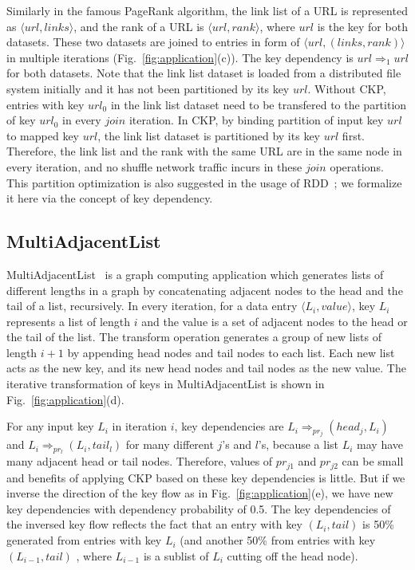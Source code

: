 \documentclass[10pt,journal,compsoc]{IEEEtran}
\begin{document}
Similarly in the famous PageRank algorithm, 
the link list of a URL is represented as $\langle url, links \rangle$,
and the rank of a URL is $\langle url, rank \rangle$, 
where $url$ is the key for both datasets. 
These two datasets are joined to entries in form of 
$\langle url, (links, rank) \rangle$ in multiple iterations (Fig.~\ref{fig:application}(c)).
The key dependency is $url \Rightarrow_{1} url$ for both datasets.
Note that the link list dataset is loaded from a distributed 
file system initially and it has not been partitioned 
by its key $url$. 
Without CKP, entries with key $url_0$ in the link list dataset need
to be transfered to the partition of key $url_0$ in every $join$ iteration.
In CKP, by binding partition of input key $url$ to mapped key $url$, 
the link list dataset is partitioned by its key $url$ first.
Therefore, the link list and the rank with the same URL 
are in the same node in every iteration, 
and no shuffle network traffic incurs in these $join$ operations. 
This partition optimization is also suggested in the usage 
of RDD~\cite{zaharia2012resilient}; 
we formalize it here via the concept of key dependency.


\subsection{MultiAdjacentList}\label{section:multiAdjlist}
MultiAdjacentList~\cite{multiAdjList} is
a graph computing application which generates 
lists of different lengths in a graph by concatenating adjacent nodes 
to the head and the tail of a list, recursively.
In every iteration, for a data entry $\langle L_i, value \rangle$,
key $L_i$ represents a list of length $i$ and 
the value is a set of adjacent nodes to the head or the tail of the list.
The transform operation
generates a group of new lists of length $i+1$ by appending head
nodes and tail nodes to each list. Each new list acts as the new key, and
its new head nodes and tail nodes as the new value.
The iterative transformation of keys in MultiAdjacentList is shown in Fig.~\ref{fig:application}(d).

For any input key $L_i$ in iteration $i$, key dependencies 
are $L_i \Rightarrow_{pr_{j}} (head_{j}, L_i)$ and 
$L_i \Rightarrow_{pr_{l}} (L_i, tail_{l})$ for many different 
$j$'s and $l$'s, because a list $L_i$ may have many adjacent head
or tail nodes. Therefore, values of $pr_{j1}$ and $pr_{j2}$ can be 
small and benefits of applying CKP based on these 
key dependencies is little.
But if we inverse the direction of the key flow as 
in Fig.~\ref{fig:application}(e), we have new key dependencies with 
dependency probability of 0.5. 
The key dependencies of the inversed key flow 
reflects the fact that
an entry with key $(L_i, tail)$ is 50\% generated from entries with 
key $L_i$ (and another 50\% from entries with key $(L_{i-1}, tail)$
, where $L_{i-1}$ is a sublist of $L_i$ cutting off the head node).
\end{document}

